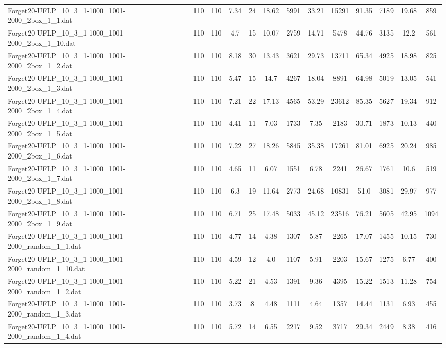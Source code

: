 \begin{table}[!ht]
{\begin{tabular}{lcccccccccccc}
Forget20-UFLP\_10\_3\_1-1000\_1001-2000\_2box\_1\_1.dat & 110 & 110 & 7.34 & 24 & 18.62 & 5991 & 33.21 & 15291 & 91.35 & 7189 & 19.68 & 859 \\
Forget20-UFLP\_10\_3\_1-1000\_1001-2000\_2box\_1\_10.dat & 110 & 110 & 4.7 & 15 & 10.07 & 2759 & 14.71 & 5478 & 44.76 & 3135 & 12.2 & 561 \\
Forget20-UFLP\_10\_3\_1-1000\_1001-2000\_2box\_1\_2.dat & 110 & 110 & 8.18 & 30 & 13.43 & 3621 & 29.73 & 13711 & 65.34 & 4925 & 18.98 & 825 \\
Forget20-UFLP\_10\_3\_1-1000\_1001-2000\_2box\_1\_3.dat & 110 & 110 & 5.47 & 15 & 14.7 & 4267 & 18.04 & 8891 & 64.98 & 5019 & 13.05 & 541 \\
Forget20-UFLP\_10\_3\_1-1000\_1001-2000\_2box\_1\_4.dat & 110 & 110 & 7.21 & 22 & 17.13 & 4565 & 53.29 & 23612 & 85.35 & 5627 & 19.34 & 912 \\
Forget20-UFLP\_10\_3\_1-1000\_1001-2000\_2box\_1\_5.dat & 110 & 110 & 4.41 & 11 & 7.03 & 1733 & 7.35 & 2183 & 30.71 & 1873 & 10.13 & 440 \\
Forget20-UFLP\_10\_3\_1-1000\_1001-2000\_2box\_1\_6.dat & 110 & 110 & 7.22 & 27 & 18.26 & 5845 & 35.38 & 17261 & 81.01 & 6925 & 20.24 & 985 \\
Forget20-UFLP\_10\_3\_1-1000\_1001-2000\_2box\_1\_7.dat & 110 & 110 & 4.65 & 11 & 6.07 & 1551 & 6.78 & 2241 & 26.67 & 1761 & 10.6 & 519 \\
Forget20-UFLP\_10\_3\_1-1000\_1001-2000\_2box\_1\_8.dat & 110 & 110 & 6.3 & 19 & 11.64 & 2773 & 24.68 & 10831 & 51.0 & 3081 & 29.97 & 977 \\
Forget20-UFLP\_10\_3\_1-1000\_1001-2000\_2box\_1\_9.dat & 110 & 110 & 6.71 & 25 & 17.48 & 5033 & 45.12 & 23516 & 76.21 & 5605 & 42.95 & 1094 \\
Forget20-UFLP\_10\_3\_1-1000\_1001-2000\_random\_1\_1.dat & 110 & 110 & 4.77 & 14 & 4.38 & 1307 & 5.87 & 2265 & 17.07 & 1455 & 10.15 & 730 \\
Forget20-UFLP\_10\_3\_1-1000\_1001-2000\_random\_1\_10.dat & 110 & 110 & 4.59 & 12 & 4.0 & 1107 & 5.91 & 2203 & 15.67 & 1275 & 6.77 & 400 \\
Forget20-UFLP\_10\_3\_1-1000\_1001-2000\_random\_1\_2.dat & 110 & 110 & 5.22 & 21 & 4.53 & 1391 & 9.36 & 4395 & 15.22 & 1513 & 11.28 & 754 \\
Forget20-UFLP\_10\_3\_1-1000\_1001-2000\_random\_1\_3.dat & 110 & 110 & 3.73 & 8 & 4.48 & 1111 & 4.64 & 1357 & 14.44 & 1131 & 6.93 & 455 \\
Forget20-UFLP\_10\_3\_1-1000\_1001-2000\_random\_1\_4.dat & 110 & 110 & 5.72 & 14 & 6.55 & 2217 & 9.52 & 3717 & 29.34 & 2449 & 8.38 & 416 \\

\end{tabular}}
\end{table}
